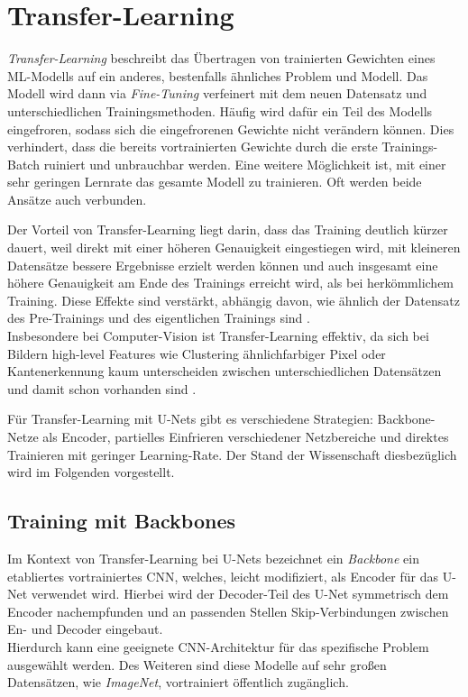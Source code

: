 \section{Transfer-Learning} \label{sec:transfer-learning}

\textit{Transfer-Learning} beschreibt das Übertragen von trainierten Gewichten eines \ac{ML}-Modells auf ein anderes, 
bestenfalls ähnliches Problem und Modell. Das Modell wird dann via \textit{Fine-Tuning} verfeinert mit dem neuen Datensatz und unterschiedlichen Trainingsmethoden.
Häufig wird dafür ein Teil des Modells eingefroren, sodass sich die eingefrorenen Gewichte nicht verändern können. Dies verhindert, 
dass die bereits vortrainierten Gewichte durch die erste Trainings-Batch ruiniert und unbrauchbar werden. Eine weitere Möglichkeit ist,
mit einer sehr geringen Lernrate das gesamte Modell zu trainieren. Oft werden beide Ansätze auch verbunden.

Der Vorteil von Transfer-Learning liegt darin, dass das Training deutlich kürzer dauert, 
weil direkt mit einer höheren Genauigkeit eingestiegen wird, mit kleineren Datensätze bessere Ergebnisse erzielt werden können
 und auch insgesamt eine höhere Genauigkeit 
am Ende des Trainings erreicht wird, als bei herkömmlichem Training. Diese Effekte sind verstärkt, 
abhängig davon, wie ähnlich der Datensatz des Pre-Trainings und des eigentlichen Trainings sind \cite{Ruder.3212017}. \\
Insbesondere bei Computer-Vision ist Transfer-Learning effektiv, da sich bei Bildern high-level Features wie Clustering 
ähnlichfarbiger Pixel oder Kantenerkennung kaum unterscheiden zwischen unterschiedlichen Datensätzen und damit schon vorhanden sind \cite{Ruder.3212017}. 

Für Transfer-Learning mit U-Nets gibt es verschiedene Strategien: Backbone-Netze als Encoder, 
partielles Einfrieren verschiedener Netzbereiche und direktes Trainieren mit geringer Learning-Rate.
Der Stand der Wissenschaft diesbezüglich wird im Folgenden vorgestellt. 

\subsection{Training mit Backbones} \label{sec:transfer-learning:backbones}

Im Kontext von Transfer-Learning bei U-Nets bezeichnet ein \textit{Backbone} ein etabliertes vortrainiertes \ac{CNN}, 
welches, leicht modifiziert, als Encoder für das U-Net verwendet wird. Hierbei wird der Decoder-Teil des U-Net 
symmetrisch dem Encoder nachempfunden und an passenden Stellen Skip-Verbindungen zwischen En- und Decoder eingebaut. \\
Hierdurch kann eine geeignete \ac{CNN}-Architektur für das spezifische Problem ausgewählt werden. Des Weiteren sind diese 
Modelle auf sehr großen Datensätzen, wie \textit{ImageNet}, vortrainiert öffentlich zugänglich. 

